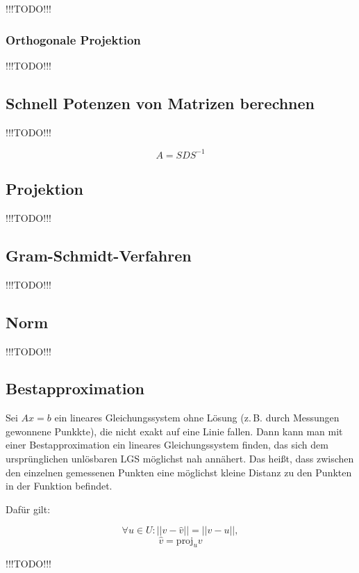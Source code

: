 \documentclass{scrartcl}
\newcommand{\TODO}{{\Huge\textcolor{HeavyRed}{\danger !!!TODO!!! \danger}}}
\begin{document}
\TODO

\subsubsection{Orthogonale Projektion}

\TODO

\subsection{Schnell Potenzen von Matrizen berechnen}

\TODO

\begin{equation}
	A = SDS^{-1}
\end{equation}

\subsection{Projektion}

\TODO


\subsection{Gram-Schmidt-Verfahren}

\TODO

\subsection{Norm}

\TODO

\subsection{Bestapproximation}

Sei $Ax = b$ ein lineares Gleichungssystem ohne Lösung (z.\,B. durch Messungen gewonnene Punkkte), die nicht
exakt auf eine Linie fallen. Dann kann man mit einer Bestapproximation ein lineares Gleichungssystem finden,
das sich dem ursprünglichen unlösbaren LGS möglichst nah annähert. Das heißt, dass zwischen den einzelnen 
gemessenen Punkten eine möglichst kleine Distanz zu den Punkten in der Funktion befindet.

Dafür gilt:

\begin{equation}
	\forall u\in U: ||v - \hat{v}|| = ||v - u||,
\end{equation}
\begin{equation}
	\hat{v} = \text{proj}_uv
\end{equation}

\TODO
\end{document}
